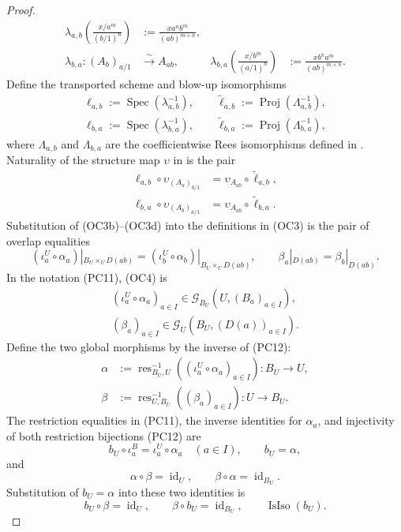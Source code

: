 \begin{proof}
\[\begin{aligned}
    \lambda_{a,b}\!\left(\frac{x/a^m}{(b/1)^n}\right)
      &:=\frac{x a^n b^m}{(ab)^{m+n}},\\
    \lambda_{b,a}\colon(A_b)_{a/1}&\xrightarrow{\sim}A_{ab},&
    \lambda_{b,a}\!\left(\frac{x/b^m}{(a/1)^n}\right)
      &:=\frac{x b^n a^m}{(ab)^{m+n}}.
  \end{aligned}                                                    \tag{OC3c}
  \]
  Define the transported scheme and blow-up isomorphisms
  \[
  \begin{gathered}
    \ell_{a,b}:=\operatorname{Spec}(\lambda_{a,b}^{-1}),\qquad
    \widetilde\ell_{a,b}:=
      \operatorname{Proj}(\Lambda_{a,b}^{-1}),\\
    \ell_{b,a}:=\operatorname{Spec}(\lambda_{b,a}^{-1}),\qquad
    \widetilde\ell_{b,a}:=
      \operatorname{Proj}(\Lambda_{b,a}^{-1}),
  \end{gathered}
  \]
  where $\Lambda_{a,b}$ and $\Lambda_{b,a}$ are the coefficientwise Rees
  isomorphisms defined in
  .  Naturality of the structure
  map $\upsilon$ in  is the pair
  \[
  \begin{aligned}
    \ell_{a,b}\circ\upsilon_{(A_a)_{b/1}}
      &=\upsilon_{A_{ab}}\circ\widetilde\ell_{a,b},\\
    \ell_{b,a}\circ\upsilon_{(A_b)_{a/1}}
      &=\upsilon_{A_{ab}}\circ\widetilde\ell_{b,a}.
  \end{aligned}                                                    \tag{OC3d}
  \]
  Substitution of (OC3b)--(OC3d) into the definitions in (OC3) is the pair
  of overlap equalities
  \[
    (\iota_a^U\circ\alpha_a)|_{B_U\times_UD(ab)}
      =(\iota_b^U\circ\alpha_b)|_{B_U\times_UD(ab)},
    \qquad
    \beta_a|_{D(ab)}=\beta_b|_{D(ab)}.                            \tag{OC4}
  \]
  In the notation (PC11), (OC4) is
  \[
  \begin{gathered}
    (\iota_a^U\circ\alpha_a)_{a\in I}
      \in\mathscr G_{B_U}(U,(B_a)_{a\in I}),\\
    (\beta_a)_{a\in I}
      \in\mathscr G_U(B_U,(D(a))_{a\in I}).
  \end{gathered}
  \]
  Define the two global morphisms by the inverse of (PC12):
  \[
  \begin{aligned}
    \alpha&:=\operatorname{res}_{B_U,U}^{-1}
      ((\iota_a^U\circ\alpha_a)_{a\in I})\colon B_U\to U,\\
    \beta&:=\operatorname{res}_{U,B_U}^{-1}
      ((\beta_a)_{a\in I})\colon U\to B_U.
  \end{aligned}                                                   \tag{OC5}
  \]
  The restriction equalities in (PC11), the inverse identities for
  $\alpha_a$, and injectivity of both restriction bijections (PC12) are
  \[
    b_U\circ\iota_a^B=\iota_a^U\circ\alpha_a\quad(a\in I),
    \qquad b_U=\alpha,
  \]
  and
  \[
    \alpha\circ\beta=\operatorname{id}_U,
    \qquad
    \beta\circ\alpha=\operatorname{id}_{B_U}.
  \]
  Substitution of $b_U=\alpha$ into these two identities is
  \[
    b_U\circ\beta=\operatorname{id}_U,
    \qquad
    \beta\circ b_U=\operatorname{id}_{B_U},
    \qquad
    \operatorname{IsIso}(b_U).
  \]
\end{proof}

